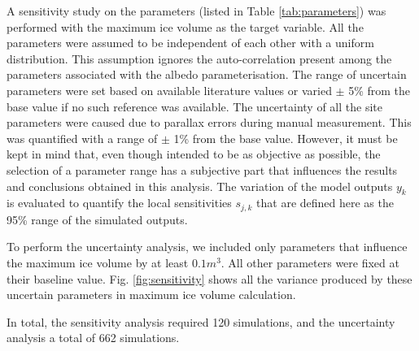 \documentclass[utf8]{frontiersSCNS} %
\begin{document}
A sensitivity study on the parameters (listed in Table \ref{tab:parameters}) was performed with the maximum ice
volume as the target variable. All the parameters were assumed to be independent of each other with a uniform
distribution.  This assumption ignores the auto-correlation present among the parameters associated with the albedo
parameterisation.  The range of uncertain parameters were set based on available literature values or varied $\pm$ 5\%
from the base value if no such reference was available. The uncertainty of all the site parameters were caused due to
parallax errors during manual measurement. This was quantified with a range of $\pm$ 1\% from the base value. However,
it must be kept in mind that, even though intended to be as objective as possible, the selection of a parameter range
has a subjective part that influences the results and conclusions obtained in this analysis.  The variation of the
model outputs $y_k$ is evaluated to quantify the local sensitivities $s_{j,k}$ that are defined here as the 95\% range
of the simulated outputs.

To perform the uncertainty analysis, we included only parameters that influence the maximum ice volume by at least
$0.1 m^3$. All other parameters were fixed at their baseline value.  Fig. \ref{fig:sensitivity} shows all the variance
produced by these uncertain parameters in maximum ice volume calculation. 

% 
% 
% 

In total, the sensitivity analysis required 120 simulations, and the uncertainty analysis a total of 662 simulations.
\end{document}
